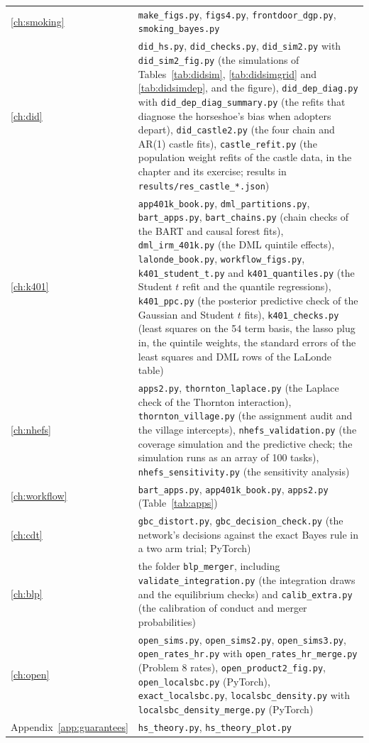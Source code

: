 {\begin{longtable}{@{}L{0.75in}L{3.5in}@{}}
\ref{ch:smoking} & \texttt{make\_figs.py}, \texttt{figs4.py}, \texttt{frontdoor\_dgp.py}, \texttt{smoking\_bayes.py} \\
\ref{ch:did} & \texttt{did\_hs.py}, \texttt{did\_checks.py}, \texttt{did\_sim2.py} with \texttt{did\_sim2\_fig.py} (the simulations of Tables~\ref{tab:didsim}, \ref{tab:didsimgrid} and \ref{tab:didsimdep}, and the figure), \texttt{did\_dep\_diag.py} with \texttt{did\_dep\_diag\_summary.py} (the refits that diagnose the horseshoe's bias when adopters depart), \texttt{did\_castle2.py} (the four chain and AR(1) castle fits), \texttt{castle\_refit.py} (the population weight refits of the castle data, in the chapter and its exercise; results in \texttt{results/res\_castle\_*.json}) \\
\ref{ch:k401} & \texttt{app401k\_book.py}, \texttt{dml\_partitions.py}, \texttt{bart\_apps.py}, \texttt{bart\_chains.py} (chain checks of the BART and causal forest fits), \texttt{dml\_irm\_401k.py} (the DML quintile effects), \texttt{lalonde\_book.py}, \texttt{workflow\_figs.py}, \texttt{k401\_student\_t.py} and \texttt{k401\_quantiles.py} (the Student $t$ refit and the quantile regressions), \texttt{k401\_ppc.py} (the posterior predictive check of the Gaussian and Student $t$ fits),
 \texttt{k401\_checks.py} (least squares on the 54 term basis, the lasso plug in, the quintile weights, the standard errors of the least squares and DML rows of the LaLonde table) \\
\ref{ch:nhefs} & \texttt{apps2.py}, \texttt{thornton\_laplace.py} (the Laplace check of the Thornton interaction), \texttt{thornton\_village.py} (the assignment audit and the village intercepts), \texttt{nhefs\_validation.py} (the coverage simulation and the predictive check; the simulation runs as an array of 100 tasks), \texttt{nhefs\_sensitivity.py} (the sensitivity analysis) \\
\ref{ch:workflow} & \texttt{bart\_apps.py}, \texttt{app401k\_book.py}, \texttt{apps2.py} (Table~\ref{tab:apps}) \\
\ref{ch:cdt} & \texttt{gbc\_distort.py}, \texttt{gbc\_decision\_check.py} (the network's decisions against the exact Bayes rule in a two arm trial; PyTorch) \\
\ref{ch:blp} & the folder \texttt{blp\_merger}, including \texttt{validate\_integration.py} (the integration draws and the equilibrium checks) and \texttt{calib\_extra.py} (the calibration of conduct and merger probabilities) \\
\ref{ch:open} & \texttt{open\_sims.py}, \texttt{open\_sims2.py}, \texttt{open\_sims3.py}, \texttt{open\_rates\_hr.py} with \texttt{open\_rates\_hr\_merge.py} (Problem 8 rates), \texttt{open\_product2\_fig.py}, \texttt{open\_localsbc.py} (PyTorch), \texttt{exact\_localsbc.py}, \texttt{localsbc\_density.py} with \texttt{localsbc\_density\_merge.py} (PyTorch) \\
Appendix~\ref{app:guarantees} & \texttt{hs\_theory.py}, \texttt{hs\_theory\_plot.py} \\
\end{longtable}
}

